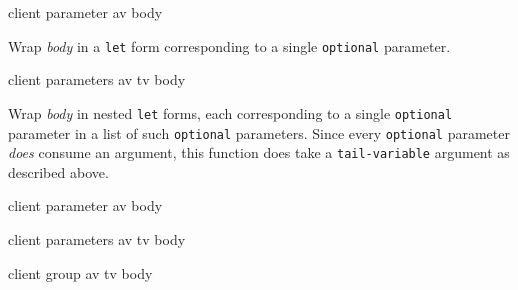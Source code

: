  {client parameter av body}

Wrap \textit{body} in a \texttt{let} form corresponding to a single
\texttt{optional} parameter.

 {client parameters av tv body}

Wrap \textit{body} in nested \texttt{let} forms, each corresponding to
a single \texttt{optional} parameter in a list of such
\texttt{optional} parameters.  Since every \texttt{optional} parameter
\textit{does} consume an argument, this function does take a
\texttt{tail-variable} argument as described above.

 {client parameter av body}

 {client parameters av tv body}

 {client group av tv body}

